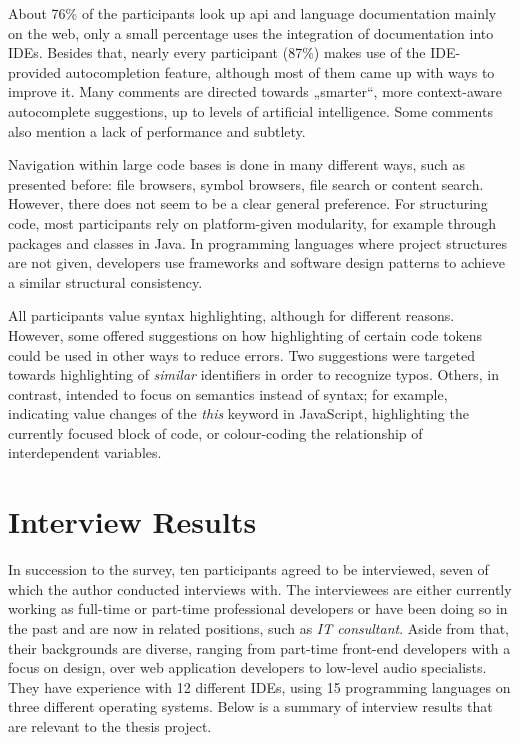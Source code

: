 About 76\% of the participants look up \ac{api} and language
documentation mainly on the web, only a small percentage uses the
integration of documentation into IDEs. Besides that, nearly every
participant (87\%) makes use of the IDE-provided \gls{autocompletion}
feature, although most of them came up with ways to improve it. Many
comments are directed towards „smarter“, more context-aware autocomplete
suggestions, up to levels of artificial intelligence. Some comments also
mention a lack of performance and subtlety.

Navigation within large code bases is done in many different ways, such
as presented before: file browsers, symbol browsers, file search or
content search. However, there does not seem to be a clear general
preference. For structuring code, most participants rely on
platform-given modularity, for example through packages and classes in
Java. In programming languages where project structures are not given,
developers use frameworks and software design patterns to achieve a
similar structural consistency.

All participants value syntax highlighting, although for different
reasons. However, some offered suggestions on how highlighting of
certain code tokens could be used in other ways to reduce errors. Two
suggestions were targeted towards highlighting of \emph{similar}
identifiers in order to recognize typos. Others, in contrast, intended
to focus on semantics instead of syntax; for example, indicating value
changes of the \emph{this} keyword in JavaScript, highlighting the
currently focused block of code, or colour-coding the relationship of
interdependent variables.

\section{Interview Results}\label{interview-results}

In succession to the survey, ten participants agreed to be interviewed,
seven of which the author conducted interviews with. The interviewees
are either currently working as full-time or part-time professional
developers or have been doing so in the past and are now in related
positions, such as \emph{IT consultant}. Aside from that, their
backgrounds are diverse, ranging from part-time front-end developers
with a focus on design, over web application developers to low-level
audio specialists. They have experience with 12 different IDEs, using 15
programming languages on three different operating systems. Below is a
summary of interview results that are relevant to the thesis project.

